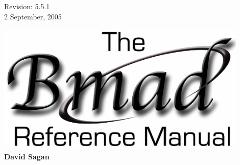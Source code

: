 \thispagestyle{empty}

\begin{flushright}
\large
  Revision: 5.5.1 \\
  2 September, 2005 \\
\end{flushright}

\vfill

{
\begin{center}
\includegraphics[width=12cm]{bmad_ref_manual.eps} \\
\vskip 0.3in
\huge\bf David Sagan
\end{center}
}

\vfill
\break